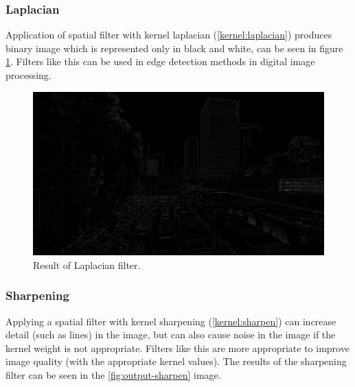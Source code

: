 \subsubsection{Laplacian}

Application of spatial filter with kernel laplacian (\ref{kernel:laplacian}) produces binary image which is represented only in black and white, can be seen in figure \ref{fig:output-laplacian}. Filters like this can be used in edge detection methods in digital image processing.

\begin{figure}
    \includegraphics[width=0.8\linewidth, center]{images/output-image/input1-laplacian.png}
    \caption{Result of Laplacian filter.}
    \label{fig:output-laplacian}
\end{figure}

\subsubsection{Sharpening}

Applying a spatial filter with kernel sharpening (\ref{kernel:sharpen}) can increase detail (such as lines) in the image, but can also cause noise in the image if the kernel weight is not appropriate. Filters like this are more appropriate to improve image quality (with the appropriate kernel values). The results of the sharpening filter can be seen in the \ref{fig:output-sharpen} image.

